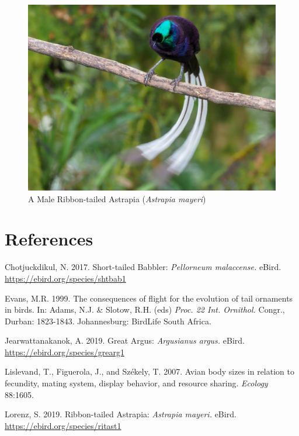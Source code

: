 \documentclass[
  12pt,
]{article}
\begin{document}
\begin{figure}
\centering
\includegraphics{Images/ribbon-tailed_astrapia.jpeg}
\caption{A Male Ribbon-tailed Astrapia (\emph{Astrapia mayeri})}
\end{figure}

\newpage

\hypertarget{references}{%
\section{References}\label{references}}

Chotjuckdikul, N. 2017. Short-tailed Babbler: \emph{Pellorneum
malaccense.} eBird. \url{https://ebird.org/species/shtbab1}

Evans, M.R. 1999. The consequences of flight for the evolution of tail
ornaments in birds. In: Adams, N.J. \& Slotow, R.H. (eds) \emph{Proc. 22
Int. Ornithol.} Congr., Durban: 1823-1843. Johannesburg: BirdLife South
Africa.

Jearwattanakanok, A. 2019. Great Argus: \emph{Argusianus argus.} eBird.
\url{https://ebird.org/species/grearg1}

Lislevand, T., Figuerola, J., and Székely, T. 2007. Avian body sizes in
relation to fecundity, mating system, display behavior, and resource
sharing. \emph{Ecology} 88:1605.

Lorenz, S. 2019. Ribbon-tailed Astrapia: \emph{Astrapia mayeri.} eBird.
\url{https://ebird.org/species/ritast1}
\end{document}

